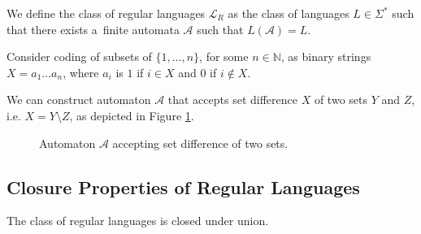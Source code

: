 	\begin{defz}
We define the class of regular languages $\mathcal{L}_R$ as the class of
languages $L \in \Sigma^*$ such that there exists a~finite automata
$\mathcal{A}$ such that $L(\mathcal{A}) = L$.
	\end{defz}
	
	\noindent\hrulefill
	\begin{example}
	Consider coding of subsets of $\{1,\ldots,n\}$, for some $n \in \mathbb{N}$, as
	binary strings $X = a_1\ldots a_n$, where $a_i$ is $1$ if $i \in X$ and $0$ if
	$i \notin X$.
	
	We can construct automaton $\mathcal{A}$ that accepts set difference $X$ of two
	sets $Y$ and $Z$, i.e. $X = Y \setminus Z$, as depicted in Figure
	\ref{set-automaton}.
	
	\begin{figure}[h!]
	\begin{center}
	 \end{center}
	 \caption{Automaton $\mathcal{A}$ accepting set difference of two
	 sets.}\label{set-automaton}
	\end{figure}
	\end{example}
	
	\noindent\hrulefill
	
 \subsection{Closure Properties of Regular Languages}

\begin{theorem}
 The class of regular languages is closed under union.
\end{theorem}

